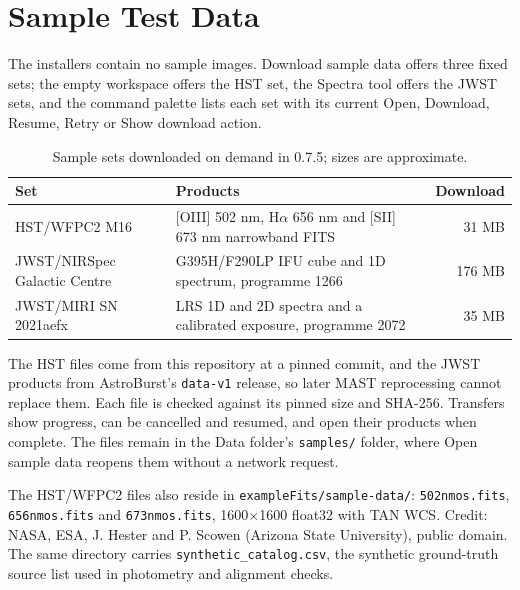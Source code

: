 \documentclass[11pt,a4paper]{article}
\newcommand{\code}[1]{\texttt{\small #1}}
\begin{document}
    \clearpage
    \appendix
    \section{Sample Test Data}
    \label{sec:samples}

    The installers contain no sample images. Download sample data offers three fixed sets; the empty workspace offers the HST set, the Spectra tool offers the JWST sets, and the command palette lists each set with its current Open, Download, Resume, Retry or Show download action.

    \begin{table}[H]
        \centering
        \small
        \begin{tabularx}{\textwidth}{lXr}
            \toprule
            \textbf{Set} & \textbf{Products} & \textbf{Download} \\
            \midrule
            HST/WFPC2 M16 & [OIII] 502 nm, H$\alpha$ 656 nm and [SII] 673 nm narrowband FITS & 31 MB \\
            JWST/NIRSpec Galactic Centre & G395H/F290LP IFU cube and 1D spectrum, programme 1266 & 176 MB \\
            JWST/MIRI SN 2021aefx & LRS 1D and 2D spectra and a calibrated exposure, programme 2072 & 35 MB \\
            \bottomrule
        \end{tabularx}
        \caption{Sample sets downloaded on demand in 0.7.5; sizes are approximate.}
    \end{table}

    The HST files come from this repository at a pinned commit, and the JWST products from AstroBurst's \code{data-v1} release, so later MAST reprocessing cannot replace them. Each file is checked against its pinned size and SHA-256. Transfers show progress, can be cancelled and resumed, and open their products when complete. The files remain in the Data folder's \code{samples/} folder, where Open sample data reopens them without a network request.

    The HST/WFPC2 files also reside in \code{exampleFits/sample-data/}: \code{502nmos.fits}, \code{656nmos.fits} and \code{673nmos.fits}, 1600$\times$1600 float32 with TAN WCS. Credit: NASA, ESA, J. Hester and P. Scowen (Arizona State University), public domain. The same directory carries \code{synthetic\_catalog.csv}, the synthetic ground-truth source list used in photometry and alignment checks.
\end{document}

